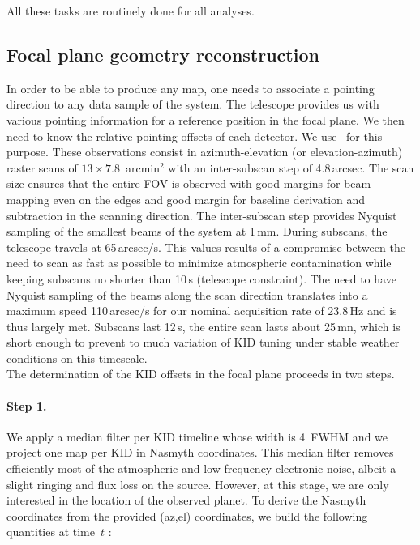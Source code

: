 All these tasks are routinely done for all analyses.

\subsection{Focal plane geometry reconstruction}
\label{se:fov_first_geometry}

In order to be able to produce any map, one needs to associate a pointing
direction to any data sample of the system. The telescope provides us with
various pointing information for a reference position in the focal plane. We
then need to know the relative pointing offsets of each detector. We use \bms\
for this purpose. These observations consist in azimuth-elevation (or
elevation-azimuth) raster scans of $13\times7.8$~arcmin$^2$ with an
inter-subscan step of 4.8\,arcsec. The scan size ensures that the entire FOV is
observed with good margins for beam mapping even on the edges and good margin
for baseline derivation and subtraction in the scanning direction. The
inter-subscan step provides Nyquist sampling of the smallest beams of the system
at 1\,mm. During subscans, the telescope travels at 65\,arcsec/s. This values
results of a compromise between the need to scan as fast as possible to minimize
atmospheric contamination while keeping subscans no shorter than 10\,s
(telescope constraint). The need to have Nyquist sampling of the beams along the
scan direction translates into a maximum speed 110\,arcsec/s for our nominal
acquisition rate of 23.8\,Hz and is thus largely met. Subscans last 12\,s, the
entire scan lasts about 25\,mn, which is short enough to prevent to much
variation of KID tuning under stable weather conditions on this timescale.\\

The determination of the KID offsets in the focal plane proceeds in two steps.

\paragraph{Step 1.} We apply a median filter per
KID timeline whose width is 4~FWHM and we project one map per KID in Nasmyth
coordinates. This median filter removes efficiently most of the atmospheric and low frequency
electronic noise, albeit a slight ringing and flux loss on the
source. However, at this stage, we are only interested in the location of the
observed planet. To derive the Nasmyth coordinates from the provided (az,el)
coordinates, we build the following quantities at time~$t$ :

